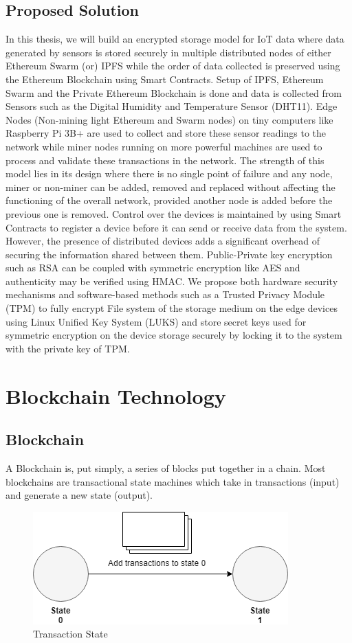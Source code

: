 \documentclass[11pt,openright]{report}
\begin{document}
\section{Proposed Solution}\label{section:proposed_solution}
In this thesis, we will build an encrypted storage model for IoT data where data generated by sensors is stored securely in multiple distributed nodes of either Ethereum Swarm (or) IPFS while the order of data collected is preserved using the Ethereum Blockchain using Smart Contracts. Setup of IPFS, Ethereum Swarm and the Private Ethereum Blockchain is done and data is collected from Sensors such as the Digital Humidity and Temperature Sensor (DHT11). Edge Nodes (Non-mining light Ethereum and Swarm nodes) on tiny computers like Raspberry Pi 3B+ are used to collect and store these sensor readings to the network while miner nodes running on more powerful machines are used to process and validate these transactions in the network. The strength of this model lies in its design where there is no single point of failure and any node, miner or non-miner can be added, removed and replaced without affecting the functioning of the overall  network, provided another node is added before the previous one is removed. Control over the devices is maintained by using Smart Contracts to register a device \cite{zhang2018smart} before it can send or receive data from the system. However, the presence of distributed devices adds a significant overhead of securing the information shared between them. Public-Private key encryption such as RSA can be coupled with symmetric encryption like AES and authenticity may be verified using HMAC. We propose both hardware security mechanisms and software-based methods such as a Trusted Privacy Module (TPM) to fully encrypt File system of the storage medium on the edge devices using Linux Unified Key System (LUKS) and store secret keys used for symmetric encryption on the device storage securely by locking it to the system with the private key of TPM.

\chapter{Blockchain Technology}
\label{chapter:blockchain_tech}
\section{Blockchain}
A Blockchain is, put simply, a series of blocks put together in a chain. Most blockchains are transactional state machines which take in transactions (input) and generate a new state (output).
\begin{figure}
	\centering
	\includegraphics[scale=0.5]{images/statemachine.png}
	\caption{Transaction State}
	\label{fig:State Change}
\end{figure}
\end{document}
